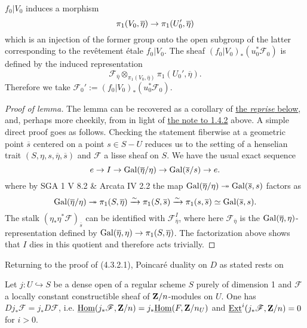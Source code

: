 \documentclass[deligne.tex]{subfiles}
\begin{document}
$f_0|V_0$ induces a morphism
\begin{equation*}
	\pi_1(V_0,\overline\eta)\rightarrow\pi_1(U_0',\overline\eta)
\end{equation*}
which is an injection of the former group onto the open subgroup of the
latter corresponding to the revêtement étale $f_0|V_0$.
The sheaf $(f_0|V_0)_*(u_0^*\mathscr F_0)$ is defined by the induced
representation
\begin{equation*}
	\mathscr F_{\overline\eta}\otimes_{\pi_1(V_0,\overline\eta)}\pi_1(U_0',\overline\eta).
\end{equation*}
Therefore we take $\mathscr F_0':=(f_0|V_0)_*(u_0^*\mathscr F_0)$.
\begin{proof}[Proof of lemma]
	The lemma can be recovered as a corollary of
	\hyperref[laumon:reprise]{the \emph{reprise} below},
	and, perhaps more cheekily, from \cite[4.3.2]{BBD} in light of
	\hyperref[laumon:1.4.2]{the note to 1.4.2} above.
	A simple direct proof goes as follows.
	Checking the statement fiberwise at a geometric point $\overline s$
	centered on a point $s\in S-U$ reduces us to the setting of
	a henselian trait $(S,\eta,s,\overline\eta,\overline s)$
	\cite[0.6]{weilii} and
	$\mathscr F$ a lisse sheaf on $S$. We have the usual exact sequence
	\begin{equation*}
		e\rightarrow I\rightarrow\operatorname{Gal}(\overline\eta/\eta)\rightarrow\operatorname{Gal}(\overline s/s)\rightarrow e.
	\end{equation*}
	where by SGA 1 V 8.2 \& Arcata IV 2.2 the map
	$\operatorname{Gal}(\overline\eta/\eta)\twoheadrightarrow\operatorname{Gal}(\overline s,s)$
	factors as
	\begin{equation*}
		\operatorname{Gal}(\overline\eta/\eta)\twoheadrightarrow\pi_1(S,\overline\eta)
		\xrightarrow\sim\pi_1(S,\overline s)
		\xrightarrow\sim\pi_1(s,\overline s)\simeq\operatorname{Gal}(\overline s,s).
	\end{equation*}
	The stalk $(\eta_*\eta^*\mathscr F)_{\overline s}$ can be identified
	with $\mathscr F_{\overline\eta}^I$, where here
	$\mathscr F_{\overline\eta}$ is the
	$\operatorname{Gal}(\overline\eta,\eta)$-representation defined by
	$\operatorname{Gal}(\overline\eta,\eta)\rightarrow\pi_1(S,\overline\eta)$.
	The factorization above shows that $I$ dies in this quotient and 
	therefore acts trivially.
\end{proof}
Returning to the proof of (4.3.2.1), Poincaré duality on $D$ as stated rests
on
\begin{theorem*}
	Let $j:U\hookrightarrow S$ be a dense open of a regular scheme $S$ purely
	of dimension 1 and $\mathscr F$ a locally constant constructible sheaf
	of $\mathbf{Z}/n$-modules on $U$. One has $Dj_*\mathscr F=j_*D\mathscr F$,
	i.e. $\underline{\operatorname{Hom}}(j_*\mathscr F,\mathbf{Z}/n)=j_*\underline{\operatorname{Hom}}(F,\mathbf{Z}/n_U)$
	and $\underline{\operatorname{Ext}}^i(j_*\mathscr F,\mathbf{Z}/n)=0$ for $i>0$.
\end{theorem*}
\end{document}
